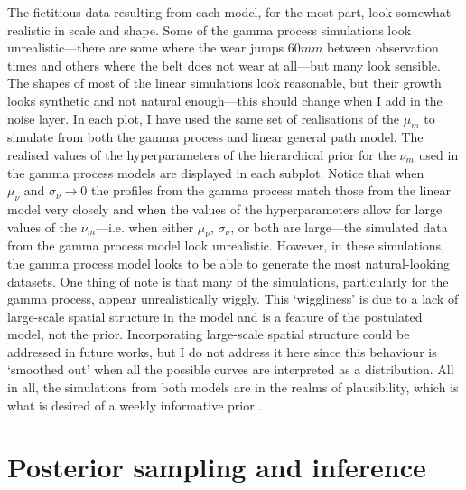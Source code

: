 The fictitious data resulting from each model, for the most part, look somewhat realistic in scale and shape. Some of the gamma process simulations look unrealistic---there are some where the wear jumps $60mm$ between observation times and others where the belt does not wear at all---but many look sensible. The shapes of most of the linear simulations look reasonable, but their growth looks synthetic and not natural enough---this should change when I add in the noise layer. In each plot, I have used the same set of realisations of the $\mu_m$ to simulate from both the gamma process and linear general path model. The realised values of the hyperparameters of the hierarchical prior for the $\nu_m$ used in the gamma process models are displayed in each subplot. Notice that when $\mu_\nu \text{ and } \sigma_\nu \longrightarrow 0$ the profiles from the gamma process match those from the linear model very closely and when the values of the hyperparameters allow for large values of the $\nu_m$---i.e. when either $\mu_\nu$, $\sigma_\nu$, or both are large---the simulated data from the gamma process model look unrealistic. However, in these simulations, the gamma process model looks to be able to generate the most natural-looking datasets. One thing of note is that many of the simulations, particularly for the gamma process, appear unrealistically wiggly. This `wiggliness' is due to a lack of large-scale spatial structure in the model and is a feature of the postulated model, not the prior. Incorporating large-scale spatial structure could be addressed in future works, but I do not address it here since this behaviour is `smoothed out' when all the possible curves are interpreted as a distribution. All in all, the simulations from both models are in the realms of plausibility, which is what is desired of a weekly informative prior \citep{gabry_vis_2019}.

\section{Posterior sampling and inference}

